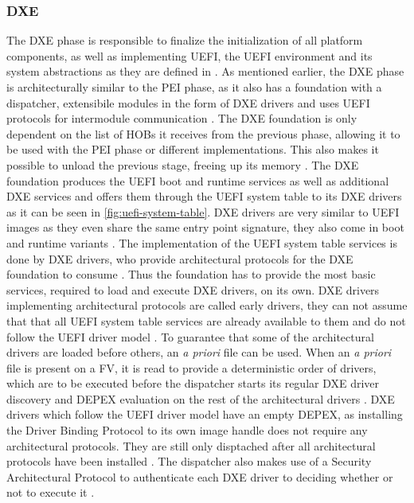 \subsubsection{\acf{DXE}}

The \ac{DXE} phase is responsible to finalize the initialization of all platform components, as well as implementing \ac{UEFI}, the \ac{UEFI} environment and its system abstractions as they are defined in \cite{uefi-spec}.
As mentioned earlier, the \ac{DXE} phase is architecturally similar to the \ac{PEI} phase, as it also has a foundation with a dispatcher, extensibile modules in the form of \ac{DXE} drivers and uses \ac{UEFI} protocols for intermodule communication \citep[Vol. 2, 2.1]{pi-spec}.
The \ac{DXE} foundation is only dependent on the list of \acp{HOB} it receives from the previous phase, allowing it to be used with the \ac{PEI} phase or different implementations.
This also makes it possible to unload the previous stage, freeing up its memory \cite[Vol. 2, 9.1]{pi-spec}.
The \ac{DXE} foundation produces the \ac{UEFI} boot and runtime services as well as additional \ac{DXE} services and offers them through the \ac{UEFI} system table to its \ac{DXE} drivers as it can be seen in \autoref{fig:uefi-system-table}\cite[Vol. 2, 2.2.1]{pi-spec}.
\ac{DXE} drivers are very similar to \ac{UEFI} images as they even share the same entry point signature, they also come in boot and runtime variants \cite[Vol. 2, 11.2.3]{pi-spec}.
The implementation of the \ac{UEFI} system table services is done by \ac{DXE} drivers, who provide architectural protocols for the \ac{DXE} foundation to consume \cite[Vol. 2, 12.1]{pi-spec}.
Thus the foundation has to provide the most basic services, required to load and execute \ac{DXE} drivers, on its own.
\ac{DXE} drivers implementing architectural protocols are called early drivers, they can not assume that that all \ac{UEFI} system table services are already available to them and do not follow the \ac{UEFI} driver model \cite[Vol. 2, 11.2.1]{pi-spec}.
To guarantee that some of the architectural drivers are loaded before others, an \emph{a priori} file can be used.
When an \emph{a priori} file is present on a \ac{FV}, it is read to provide a deterministic order of drivers, which are to be executed before the dispatcher starts its regular \ac{DXE} driver discovery and \ac{DEPEX} evaluation on the rest of the architectural drivers \cite[Vol. 2, 10.3]{pi-spec}.
\ac{DXE} drivers which follow the \ac{UEFI} driver model have an empty \ac{DEPEX}, as installing the Driver Binding Protocol to its own image handle does not require any architectural protocols.
They are still only disptached after all architectural protocols have been installed \cite[Vol. 2, 11.2.2]{pi-spec}.
The dispatcher also makes use of a Security Architectural Protocol to authenticate each \ac{DXE} driver to deciding whether or not to execute it \cite[Vol. 2, 10.13]{pi-spec}.

